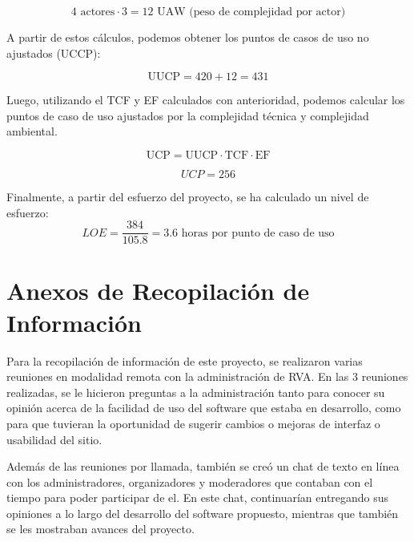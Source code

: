 \[
 4 \text{ actores} \cdot 3 = 12 \text{ UAW} \text{ (peso de complejidad por actor)}
\]

A partir de estos cálculos, podemos obtener los puntos de casos de uso no ajustados (UCCP):

\[
\text{UUCP} = 420 + 12 = 431
\]

Luego, utilizando el TCF y EF calculados con anterioridad, podemos calcular los puntos de caso de uso ajustados por la complejidad técnica y complejidad ambiental.

\[
\text{UCP} = \text{UUCP} \cdot \text{TCF} \cdot \text{EF}
\]

\[
UCP = 256
\]


Finalmente, a partir del esfuerzo del proyecto, se ha calculado un nivel de esfuerzo:
\[
LOE = \frac{384}{105.8} = 3.6 \text{ horas por punto de caso de uso}
\]

\section{Anexos de Recopilación de Información}
Para la recopilación de información de este proyecto, se realizaron varias reuniones en modalidad remota con la administración de RVA. En las 3 reuniones realizadas, se le hicieron preguntas a la administración tanto para conocer su opinión acerca de la facilidad de uso del software que estaba en desarrollo, como para que tuvieran la oportunidad de sugerir cambios o mejoras de interfaz o usabilidad del sitio.

Además de las reuniones por llamada, también se creó un chat de texto en línea con los administradores, organizadores y moderadores que contaban con el tiempo para poder participar de el. En este chat, continuarían entregando sus opiniones a lo largo del desarrollo del software propuesto, mientras que también se les mostraban avances del proyecto.

